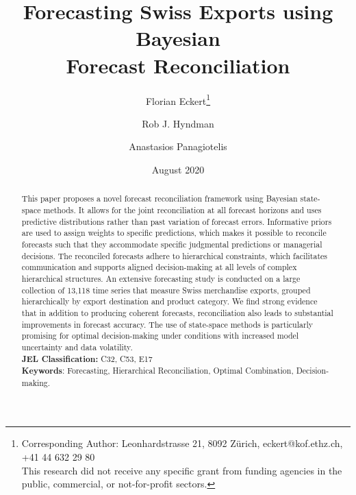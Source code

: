 \documentclass[a4paper,fleqn,11pt]{article}
\begin{document}
\title{\huge Forecasting Swiss Exports using Bayesian \\Forecast Reconciliation}

\author[$\dagger$]{Florian Eckert\thanks{Corresponding Author: Leonhardstrasse 21, 8092 Zürich, eckert@kof.ethz.ch, +41 44 632 29 80\\This research did not receive any specific grant from funding agencies in the public, commercial, or not-for-profit sectors.}}
\author[$\ddagger$]{Rob J. Hyndman}
\author[$\ddagger$]{Anastasios Panagiotelis}
\date{August 2020}

\clearpage\maketitle
\thispagestyle{empty}

\begin{abstract}
	\noindent This paper proposes a novel forecast reconciliation framework using Bayesian state-space methods. It allows for the joint reconciliation at all forecast horizons and uses predictive distributions rather than past variation of forecast errors. Informative priors are used to assign weights to specific predictions, which makes it possible to reconcile forecasts such that they accommodate specific judgmental predictions or managerial decisions. The reconciled forecasts adhere to hierarchical constraints, which facilitates communication and supports aligned decision-making at all levels of complex hierarchical structures. An extensive forecasting study is conducted on a large collection of 13,118 time series that measure Swiss merchandise exports, grouped hierarchically by export destination and product category. We find strong evidence that in addition to producing coherent forecasts, reconciliation also leads to substantial improvements in forecast accuracy. The use of state-space methods is particularly promising for optimal decision-making under conditions with increased model uncertainty and data volatility. \\
	
	\noindent \textbf{JEL Classification:} C32, C53, E17\\
	\noindent \textbf{Keywords}: Forecasting, Hierarchical Reconciliation, Optimal Combination, Decision-making.
\end{abstract}
\clearpage
\setcounter{page}{1}
\end{document}
